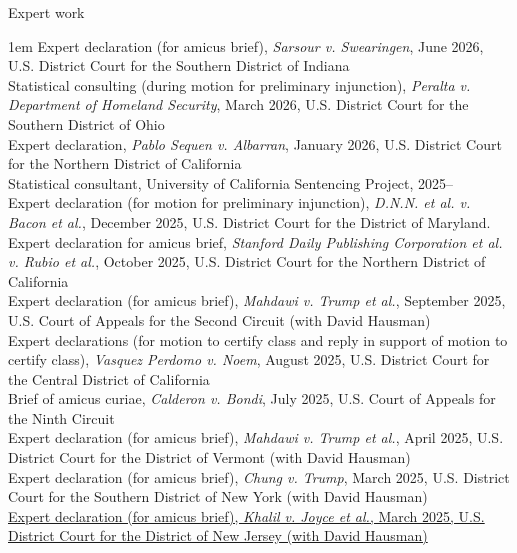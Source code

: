 \documentclass[10.9pt]{article}
\makeatletter
\newcommand\donotbreakhere{\par\nobreak\@afterheading\vspace{1em}}
\newcommand{\years}[1]{\marginnote{\scriptsize #1}}
\newenvironment{indnt}{\begin{adjustwidth}{1em}{}}{\end{adjustwidth}}
\makeatother
\begin{document}
{\large Expert work} \donotbreakhere
\begin{indnt}
Expert declaration (for amicus brief), \textit{Sarsour v. Swearingen}, June 2026, U.S. District Court for the Southern District of Indiana\\[.75em]
Statistical consulting (during motion for preliminary injunction), \textit{Peralta v. Department of Homeland Security}, March 2026, U.S. District Court for the Southern District of Ohio\\[.75em]
Expert declaration, \textit{Pablo Sequen v. Albarran}, January 2026, U.S. District Court for the Northern District of California\\[.75em]
Statistical consultant, University of California Sentencing Project, 2025--\\[0.75em]
Expert declaration (for motion for preliminary injunction), \textit{D.N.N. et al. v. Bacon et al.}, December 2025, U.S. District Court for the District of Maryland. \\[0.75em]
Expert declaration for amicus brief, \textit{Stanford Daily Publishing Corporation et al. v. Rubio et al.}, October 2025, U.S. District Court for the Northern District of California\\[0.75em]
Expert declaration (for amicus brief), \textit{Mahdawi v. Trump et al.}, September 2025, U.S. Court of Appeals for the Second Circuit (with David Hausman)\\[0.75em]
Expert declarations (for motion to certify class and reply in support of motion to certify class), \textit{Vasquez Perdomo v. Noem}, August 2025, U.S. District Court for the Central District of California\\[0.75em]
Brief of amicus curiae, \textit{Calderon v. Bondi}, July 2025, U.S. Court of Appeals for the Ninth Circuit\\[0.75em]
Expert declaration (for amicus brief), \textit{Mahdawi v. Trump et al.}, April 2025, U.S. District Court for the District of Vermont (with David Hausman)\\[0.75em]
Expert declaration (for amicus brief), \textit{Chung v. Trump}, March 2025, U.S. District Court for the Southern District of New York (with David Hausman) \\[0.75em]
\href{https://ccrjustice.org/sites/default/files/attach/2025/03/110-1_3-24-25_Immigration-amicus-brief_w.pdf}{Expert declaration (for amicus brief), \textit{Khalil v. Joyce et al.}, March 2025, U.S. District Court for the District of New Jersey (with David Hausman)}
\end{indnt}
\vspace{1.5em}
\end{document}
